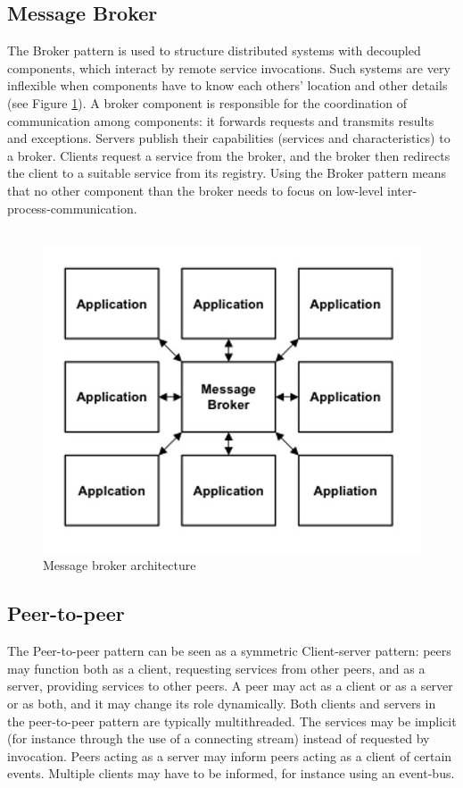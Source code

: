 \documentclass{article}
\begin{document}
\subsection{Message Broker}
The Broker pattern is used to structure distributed systems with decoupled components, which interact by remote service invocations. Such systems are very inflexible when components have to know each others' location and other details (see Figure \ref{fig_mbr}). A broker component is responsible for the coordination of communication among components: it forwards requests and transmits results and exceptions. Servers publish their capabilities (services and characteristics) to a broker. Clients request a service from the broker, and the broker then redirects the client to a suitable service from its registry. Using the Broker pattern means that no other component than the broker needs to focus on low-level inter-process-communication.\\\\


\begin{figure}[h]
\centering
\includegraphics[scale=0.8]{mbr.jpg}
\caption{Message broker architecture}
\label{fig_mbr}
\end{figure}
\newpage



\subsection{Peer-to-peer}
The Peer-to-peer pattern can be seen as a symmetric Client-server pattern: peers may function both as a client, requesting services from other peers, and as a server, providing services to other peers. A peer may act as a client or as a server or as both, and it may change its role dynamically. Both clients and servers in the peer-to-peer pattern are typically multithreaded. The services may be implicit (for instance through the use of a connecting stream) instead of requested by invocation. Peers acting as a server may inform peers acting as a client of certain events. Multiple clients may have to be informed, for instance using an event-bus.\\\\
\end{document}
